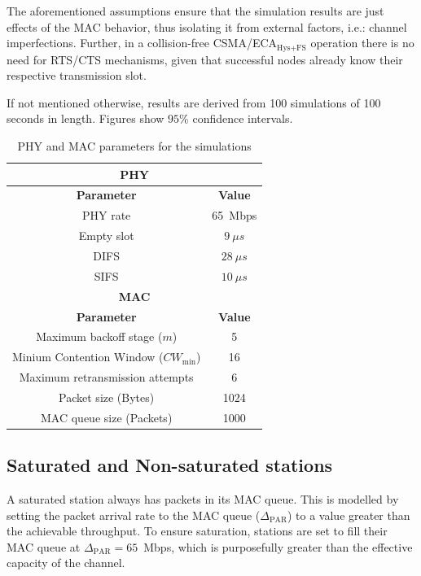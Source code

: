 \documentclass[a4paper,journal]{IEEEtran}
\begin{document}
	The aforementioned assumptions ensure that the simulation results are just effects of the MAC behavior, thus isolating it from external factors, i.e.: channel imperfections. Further, in a collision-free CSMA/ECA$_{\text{Hys+FS}}$ operation there is no need for RTS/CTS mechanisms, given that successful nodes already know their respective transmission slot.
	
	If not mentioned otherwise, results are derived from 100 simulations of 100 seconds in length. Figures show $95$\% confidence intervals.
	
	\begin{table}
		\centering
		\caption{PHY and MAC parameters for the simulations}
		\label{tab:mac-params}
		\begin{tabular}{|c|c|}
			\hline
			\multicolumn{2}{|c|}{{\bfseries PHY}}\\
			\hline
			{\bfseries Parameter} & {\bfseries Value}\\
			\hline
			PHY rate & 65~Mbps\\
			Empty slot & $9~\mu s$\\
			DIFS & $28~\mu s$\\
			SIFS & $10~\mu s$\\
			\hline
			\multicolumn{2}{|c|}{{\bfseries MAC}}\\
			\hline
			{\bfseries Parameter} & {\bfseries Value}\\
			\hline
			Maximum backoff stage ($m$) & 5\\
			Minium Contention Window ($CW_{\min}$) & 16\\
			Maximum retransmission attempts & 6\\
			Packet size (Bytes) & 1024\\
			MAC queue size (Packets) & 1000\\
			\hline
		\end{tabular}
	\end{table}
	
	\subsection{Saturated and Non-saturated stations}\label{unsaturation}
	A saturated station always has packets in its MAC queue. This is modelled by setting the packet arrival rate to the MAC queue ($\Delta_{\text{PAR}}$) to a value greater than the achievable throughput. To ensure saturation, stations are set to fill their MAC queue at $\Delta_{\text{PAR}}=65$~Mbps, which is purposefully greater than the effective capacity of the channel.
	
\end{document}

